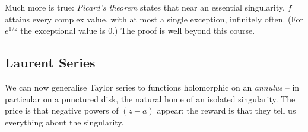 \documentclass[a4paper]{scrartcl}
\begin{document}
\begin{remark}
    Much more is true: \emph{Picard's theorem} states that near an essential singularity, $f$ attains every complex value, with at most a single exception, infinitely often. (For $e^{1/z}$ the exceptional value is $0$.) The proof is well beyond this course.
\end{remark}

\subsection{Laurent Series}

We can now generalise Taylor series to functions holomorphic on an \emph{annulus} -- in particular on a punctured disk, the natural home of an isolated singularity. The price is that negative powers of $(z - a)$ appear; the reward is that they tell us everything about the singularity.

\begin{center}
\end{center}
\end{document}
